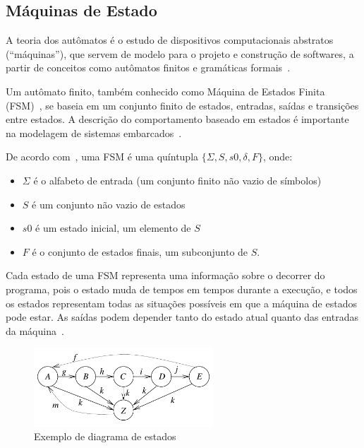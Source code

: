 
\subsection{Máquinas de Estado}

A teoria dos autômatos é o estudo de dispositivos computacionais abstratos (``máquinas''), que servem de modelo para o projeto e construção de softwares, a partir de conceitos como autômatos finitos e gramáticas formais~\cite{hopcroft:2001}.

Um autômato finito, também conhecido como Máquina de Estados Finita (FSM)~\cite{wagner:2006}, se baseia em um conjunto finito de estados, entradas, saídas e transições entre estados. A descrição do comportamento baseado em estados é importante na modelagem de sistemas embarcados~\cite{marwedel:2010}.

De acordo com~, uma FSM é uma quíntupla \(\{\Sigma, S, s0, \delta, F\}\), onde:
\begin{itemize}
    \item \(\Sigma\) é o alfabeto de entrada (um conjunto finito não vazio de símbolos)
    \item \(S\) é um conjunto não vazio de estados
    \item \(s0\) é um estado inicial, um elemento de \(S\)
    \item \(F\) é o conjunto de estados finais, um subconjunto de \(S\).
\end{itemize}

Cada estado de uma FSM representa uma informação sobre o decorrer do programa, pois o estado muda de tempos em tempos durante a execução, e todos os estados representam todas as situações possíveis em que a máquina de estados pode estar. As saídas podem depender tanto do estado atual quanto das entradas da máquina~\cite{wagner:2006}.

\begin{figure}[ht]
	\caption{\label{fig:fsm}Exemplo de diagrama de estados}
	\begin{center}
	    \includegraphics[width=0.6\textwidth]{resources/fsm_marwedel}
	\end{center}
\end{figure}

